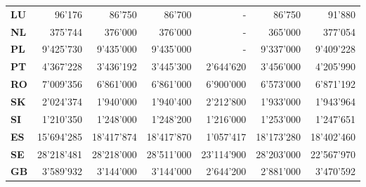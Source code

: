 \begin{tabular}{lrrrrrr}
\textbf{LU     } &     96'176 &     86'750 &     86'700 &          - &     86'750 &     91'880 \\
\textbf{NL     } &    375'744 &    376'000 &    376'000 &          - &    365'000 &    377'054 \\
\textbf{PL     } &  9'425'730 &  9'435'000 &  9'435'000 &          - &  9'337'000 &  9'409'228 \\
\textbf{PT     } &  4'367'228 &  3'436'192 &  3'445'300 &  2'644'620 &  3'456'000 &  4'205'990 \\
\textbf{RO     } &  7'009'356 &  6'861'000 &  6'861'000 &  6'900'000 &  6'573'000 &  6'871'192 \\
\textbf{SK     } &  2'024'374 &  1'940'000 &  1'940'400 &  2'212'800 &  1'933'000 &  1'943'964 \\
\textbf{SI     } &  1'210'350 &  1'248'000 &  1'248'200 &  1'216'000 &  1'253'000 &  1'247'651 \\
\textbf{ES     } & 15'694'285 & 18'417'874 & 18'417'870 &  1'057'417 & 18'173'280 & 18'402'460 \\
\textbf{SE     } & 28'218'481 & 28'218'000 & 28'511'000 & 23'114'900 & 28'203'000 & 22'567'970 \\
\textbf{GB     } &  3'589'932 &  3'144'000 &  3'144'000 &  2'644'200 &  2'881'000 &  3'470'592 \\
\bottomrule
\end{tabular}
